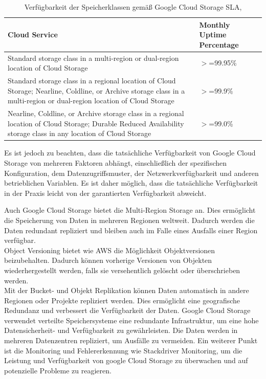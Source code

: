 \begin{table}[!h]
\centering
\begin{tabular}{ |p{5cm}|p{5cm}| }
\hline
Cloud Service & Monthly Uptime Percentage \\
\hline
\cline{1-2}
Standard storage class in a multi-region or dual-region location of Cloud Storage & $>$=99.95\% \\
\cline{1-2}
Standard storage class in a regional location of Cloud Storage; Nearline, Coldline, or Archive storage class in a multi-region or dual-region location of Cloud Storage & $>$=99.9\% \\
\cline{1-2}
Nearline, Coldline, or Archive storage class in a regional location of Cloud Storage; Durable Reduced Availability storage class in any location of Cloud Storage & $>$=99.0\% \\
\cline{1-2}
\end{tabular}
\caption{Verfügbarkeit der Speicherklassen gemäß Google Cloud Storage SLA, }
\end{table}

Es ist jedoch zu beachten, dass die tatsächliche Verfügbarkeit von Google Cloud Storage von mehreren Faktoren abhängt, einschließlich der spezifischen Konfiguration, dem Datenzugriffsmuster, der Netzwerkverfügbarkeit und anderen betrieblichen Variablen. Es ist daher möglich, dass die tatsächliche Verfügbarkeit in der Praxis leicht von der garantierten Verfügbarkeit abweicht.

Auch Google Cloud Storage bietet die Multi-Region Storage an. Dies ermöglicht die Speicherung von Daten in mehreren Regionen weltweit. Dadurch werden die Daten redundant repliziert und bleiben auch im Falle eines Ausfalls einer Region verfügbar.\\ 

Object Versioning bietet wie AWS die Möglichkeit Objektversionen beizubehalten. Dadurch können vorherige Versionen von Objekten wiederhergestellt werden, falls sie versehentlich gelöscht oder überschrieben werden.\\

Mit der Bucket- und Objekt Replikation können Daten automatisch in andere Regionen oder Projekte repliziert werden. Dies ermöglicht eine geografische Redundanz und verbessert die Verfügbarkeit der Daten. Google Cloud Storage verwendet verteilte Speichersysteme eine redundante Infrastruktur, um eine hohe Datensicherheit- und Verfügbarkeit zu gewährleisten. Die Daten werden in mehreren Datenzentren repliziert, um Ausfälle zu vermeiden. Ein weiterer Punkt ist die Monitoring und Fehlererkennung wie Stackdriver Monitoring, um die Leistung und Verfügbarkeit von google Cloud Storage zu überwachen und auf potenzielle Probleme zu reagieren.



